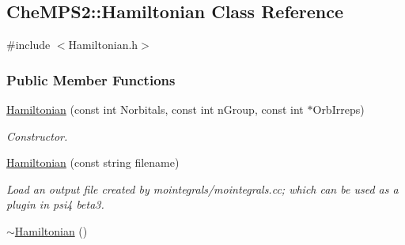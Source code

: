\hypertarget{classCheMPS2_1_1Hamiltonian}{\subsection{Che\-M\-P\-S2\-:\-:Hamiltonian Class Reference}
\label{classCheMPS2_1_1Hamiltonian}
}


{\ttfamily \#include $<$Hamiltonian.\-h$>$}

\subsubsection*{Public Member Functions}
\begin{DoxyCompactItemize}
\item 
\hyperlink{classCheMPS2_1_1Hamiltonian_a4ae3520da1ff8515a313c4357592a3d1}{Hamiltonian} (const int Norbitals, const int n\-Group, const int $\ast$Orb\-Irreps)
\begin{DoxyCompactList}\small\item\em Constructor. \end{DoxyCompactList}\item 
\hyperlink{classCheMPS2_1_1Hamiltonian_a6d20a22b56d996fbd4c9628d4a671a6d}{Hamiltonian} (const string filename)
\begin{DoxyCompactList}\small\item\em Load an output file created by mointegrals/mointegrals.\-cc; which can be used as a plugin in psi4 beta3. \end{DoxyCompactList}\item 
\hypertarget{classCheMPS2_1_1Hamiltonian_a27623ac9db80f85c07761ac3ce554a51}{\hyperlink{classCheMPS2_1_1Hamiltonian_a27623ac9db80f85c07761ac3ce554a51}{$\sim$\-Hamiltonian} ()}\label{classCheMPS2_1_1Hamiltonian_a27623ac9db80f85c07761ac3ce554a51}


\end{DoxyCompactItemize}
